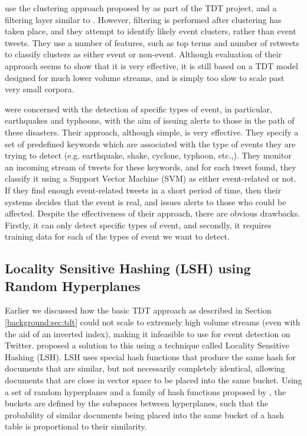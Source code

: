 \cite{becker2011beyond} use the clustering approach proposed by \cite{Yang98} as part of the TDT project, and a filtering layer similar to \cite{sankaranarayanan2009twitterstand}.
However, filtering is performed after clustering has taken place, and they attempt to identify likely event clusters, rather than event tweets.
They use a number of features, such as top terms and number of retweets to classify clusters as either event or non-event.
Although evaluation of their approach seems to show that it is very effective, it is still based on a TDT model designed for much lower volume streams, and is simply too slow to scale past very small corpora.

\cite{Sakaki:2010:EST:1772690.1772777} were concerned with the detection of specific types of event, in particular, earthquakes and typhoons, with the aim of issuing alerts to those in the path of these disasters.
Their approach, although simple, is very effective.
They specify a set of predefined keywords which are associated with the type of events they are trying to detect (e.g. earthquake, shake, cyclone, typhoon, etc.,).
They monitor an incoming stream of tweets for these keywords, and for each tweet found, they classify it using a Support Vector Machine (SVM) as either event-related or not.
If they find enough event-related tweets in a short period of time, then their systems decides that the event is real, and issues alerts to those who could be affected.
Despite the effectiveness of their approach, there are obvious drawbacks. Firstly, it can only detect specific types of event, and secondly, it requires training data for each of the types of event we want to detect.

\subsection{Locality Sensitive Hashing (LSH) using Random Hyperplanes}
\label{background:sec:lsh}
Earlier we discussed how the basic TDT approach as described in Section \ref{background:sec:tdt} could not scale to extremely high volume streams (even with the aid of an inverted index), making it infeasible to use for event detection on Twitter.
\cite{Petrovic:2010:SFS:1857999.1858020} proposed a solution to this using a technique called Locality Sensitive Hashing (LSH).
LSH uses special hash functions that produce the same hash for documents that are similar, but not necessarily completely identical, allowing documents that are close in vector space to be placed into the same bucket.
Using a set of random hyperplanes and a family of hash functions proposed by \cite{Charikar2002}, the buckets are defined by the subspaces between hyperplanes, such that the probability of similar documents being placed into the same bucket of a hash table is proportional to their similarity.

